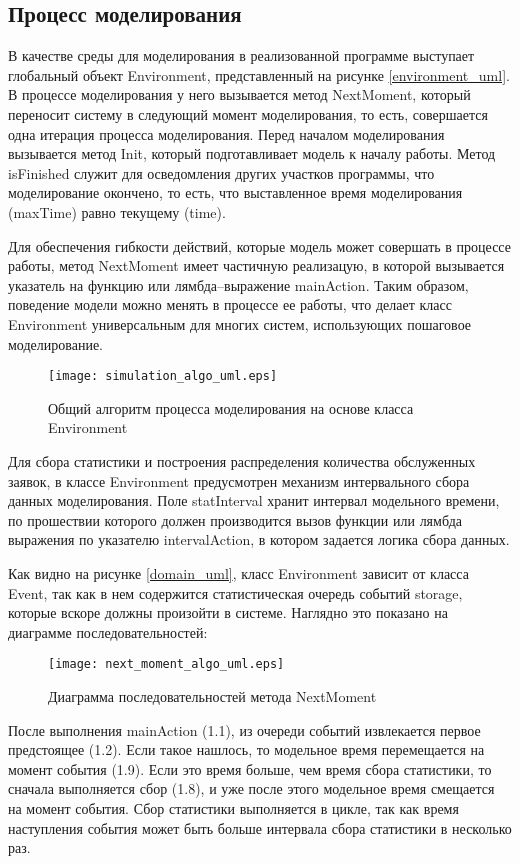 \subsection{Процесс моделирования}
В качестве среды для моделирования в реализованной программе выступает глобальный объект Environment, представленный на рисунке \ref{environment_uml}. В процессе моделирования у него вызывается метод NextMoment, который переносит систему в следующий момент моделирования, то есть, совершается одна итерация процесса моделирования. Перед началом моделирования вызывается метод Init, который подготавливает модель к началу работы. Метод isFinished служит для осведомления других участков программы, что моделирование окончено, то есть, что выставленное время моделирования (maxTime) равно текущему (time).

Для обеспечения гибкости действий, которые модель может совершать в процессе работы, метод NextMoment имеет частичную реализацую, в которой вызывается указатель на функцию или лямбда--выражение mainAction. Таким образом, поведение модели можно менять в процессе ее работы, что делает класс Environment универсальным для многих систем, использующих пошаговое моделирование.
\begin{figure}[H]
	\centering
	\texttt{[image: simulation\_algo\_uml.eps]}
	\caption{Общий алгоритм процесса моделирования на основе класса Environment}
	\label{simulation_algo_uml}
\end{figure}

Для сбора статистики и построения распределения количества обслуженных заявок, в классе Environment предусмотрен механизм интервального сбора данных моделирования. Поле statInterval хранит интервал модельного времени, по прошествии которого должен производится вызов функции или лямбда выражения по указателю intervalAction, в котором задается логика сбора данных.

Как видно на рисунке \ref{domain_uml}, класс Environment зависит от класса Event, так как в нем содержится статистическая очередь событий storage, которые вскоре должны произойти в системе. Наглядно это показано на диаграмме последовательностей:
\begin{figure}[H]
	\centering
	\texttt{[image: next\_moment\_algo\_uml.eps]}
	\caption{Диаграмма последовательностей метода NextMoment}
	\label{next_moment_algo_uml}
\end{figure}
После выполнения mainAction (1.1), из очереди событий извлекается первое предстоящее (1.2). Если такое нашлось, то модельное время перемещается на момент события (1.9). Если это время больше, чем время сбора статистики, то сначала выполняется сбор (1.8), и уже после этого модельное время смещается на момент события. Сбор статистики выполняется в цикле, так как время наступления события может быть больше интервала сбора статистики в несколько раз.
\clearpage
